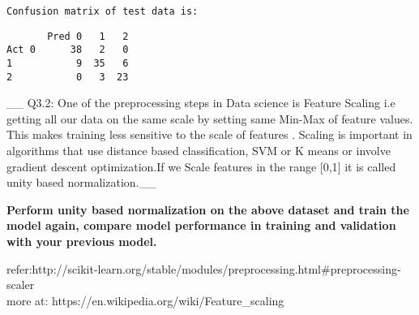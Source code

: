 \documentclass[11pt]{article}
\begin{document}
    \begin{Verbatim}[commandchars=\\\{\}]
Confusion matrix of test data is:

    \end{Verbatim}

    
    \begin{verbatim}
       Pred 0   1   2
Act 0      38   2   0
1           9  35   6
2           0   3  23
    \end{verbatim}

    
    \_\_ Q3.2: One of the preprocessing steps in Data science is Feature
Scaling i.e getting all our data on the same scale by setting same
Min-Max of feature values. This makes training less sensitive to the
scale of features . Scaling is important in algorithms that use distance
based classification, SVM or K means or involve gradient descent
optimization.If we Scale features in the range {[}0,1{]} it is called
unity based normalization.\_\_

\textbf{Perform unity based normalization on the above dataset and train
the model again, compare model performance in training and validation
with your previous model.}

refer:http://scikit-learn.org/stable/modules/preprocessing.html\#preprocessing-scaler\\
more at: https://en.wikipedia.org/wiki/Feature\_scaling
\end{document}
